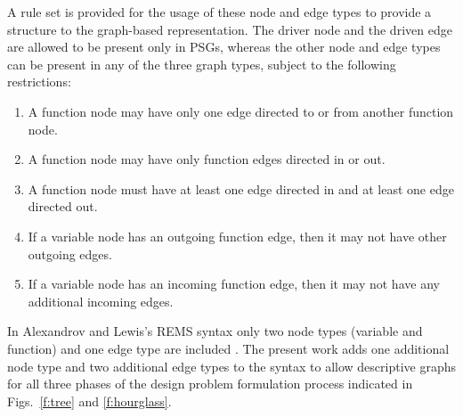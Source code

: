   A rule set is provided for the usage of these node and edge types to provide a structure to the graph-based representation.
  The driver node and the driven edge are allowed to be present only in PSGs, whereas the other node and edge types can be present in any of the three graph types, 
  subject to the following restrictions: 
  \begin{enumerate}
  \item A function node may have only one edge directed to or from another function node.
  \item A function node may have only function edges directed in or out.
  \item A function node must have at least one edge directed in and at least one edge 
    directed out.
  \item If a variable node has an outgoing function edge, then it may not have other outgoing edges.
  \item If a variable node has an incoming function edge, then it may not have any additional incoming edges.
  \end{enumerate}

  In Alexandrov and Lewis's REMS syntax only two node types (variable and function) 
  and one edge type are included \cite{alexandrov2004}. The present work adds one additional 
  node type and two additional edge types to the syntax to allow descriptive
  graphs for all three phases of the design problem formulation process indicated in Figs.~\ref{f:tree} and \ref{f:hourglass}.

